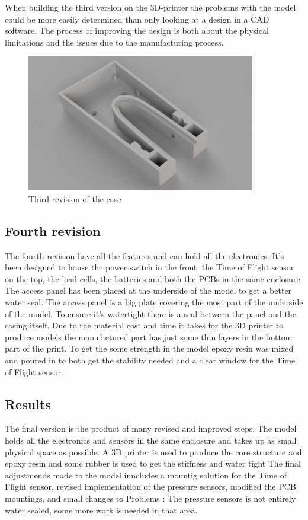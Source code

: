 When building the third version on the 3D-printer the problems with the model could be more easily determined than only looking at a design in a CAD software. The process of improving the design is both about the physical limitations and the issues  due to the manufacturing process. 


\begin{figure}[H]
\begin{center}
	\includegraphics[width = 10cm]{Figures/Case_rev_3.png}
	\caption{Third revision of the case}
	\label{Case_rev_2}
\end{center}
\end{figure}

\subsection{Fourth revision}

The fourth revision have all the features and can hold all the electronics. It's been designed to house the power switch in the front, the Time of Flight sensor on the top, the load cells, the batteries and both the PCBs in the same enclosure. The access panel has been placed at the underside of the model to get a better water seal. The access panel is a big plate covering the most part of the underside of the model. To ensure it's watertight there is a seal between the panel and the casing itself.
Due to the material cost and time it takes for the 3D printer to produce models the manufactured part has just some thin layers in the bottom part of the print. To get the some strength in the model epoxy resin was mixed and poured in to both get the stability needed and a clear window for the Time of Flight sensor.

\subsection{Results}
The final version is the product of many revised and improved steps. The model holds all the electronics and sensors in the same enclosure and takes up as small physical space as possible. A 3D printer is used to produce the core structure and epoxy resin and some rubber is used to get the stiffness and water tight The final adjustmends made to the model inncludes a mountig solution for the 
Time of Flight sensor, revised implementation of the pressure sensors, modified the PCB mountings, and small changes to 
Problems :
The pressure sensors is not entirely water sealed, some more work is needed in that area.  

